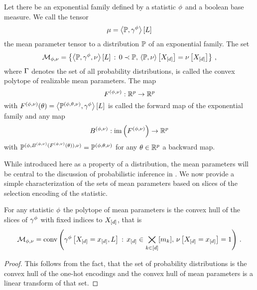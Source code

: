 \begin{definition}\label{def:meanForwardBackward}
	Let there be an exponential family defined by a statistic $\phi$ and a boolean base measure.
	We call the tensor
		\[ \mu = \left\langle \mathbb{P},\gamma^{\phi}\right\rangle \left[ L \right] \]
	the mean parameter tensor to a distribution $\mathbb{P}$ of an exponential family.
	The set 
		\[ \mathcal{M}_{\phi,\nu} = \left\{\left\langle \mathbb{P},\gamma^{\phi},\nu\right\rangle \left[ L \right] \, : \, 0\prec\mathbb{P} , \, \left\langle \mathbb{P},\nu\right\rangle \left[ X_{[d]} \right] 
		= \nu\left[X_{[d]}\right] \right\} \, , \]
	where $\Gamma$ denotes the set of all probability distributions,
	is called the convex polytope of realizable mean parameters.
	The map
		\[ F^{(\phi,\nu)} :  \mathbb{R}^{p}\rightarrow\mathbb{R}^{p}\]
	with $F^{(\phi,\nu)}(\theta) = \left\langle \mathbb{P}^{(\phi,\theta,\nu)},\gamma^{\phi}\right\rangle \left[ L \right]$ is called the forward map of the exponential family and any map
		\[ B^{(\phi,\nu)} : \mathrm{im}\left(F^{(\phi,\nu)}\right) \rightarrow \mathbb{R}^{p}\]
	with $\mathbb{P}^{(\phi,B^{(\phi,\nu)}(F^{(\phi,\nu)}(\theta)),\nu)} = \mathbb{P}^{(\phi,\theta,\nu)}$ for any $\theta\in\mathbb{R}^{p}$ a backward map.
\end{definition}


While introduced here as a property of a distribution, the mean parameters will be central to the discussion of probabilistic inference in .
We now provide a simple characterization of the sets of mean parameters based on slices of the selection encoding of the statistic.

\begin{theorem}\label{the:meanPolytopeConvHull}
	For any statistic $\phi$ the polytope of mean parameters is the convex hull of the slices of $\gamma^{\phi}$ with fixed indices to $X_{[d]}$, that is
	\begin{align*}
		\mathcal{M}_{\phi,\nu} 
		= \mathrm{conv}\left(\gamma^{\phi}\left[X_{[d]}=x_{[d]},L\right] \, : \, x_{[d]}\in\bigtimes_{k\in[d]}[m_{k}], \, \nu\left[X_{[d]}=x_{[d]}\right]=1\right) \, . 
	\end{align*}	
\end{theorem}
\begin{proof}
	This follows from the fact, that the set of probability distributions is the convex hull of the one-hot encodings and the convex hull of mean parameters is a linear transform of that set.
\end{proof}



